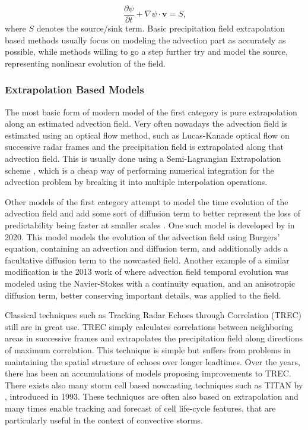 \begin{equation}
\
\frac{\partial \psi}{\partial t} + \nabla \psi \cdot \pmb{v} = S,
\end{equation}
%
where $S$ denotes the source/sink term. Basic precipitation field extrapolation based methods usually focus on modeling the advection part as accurately as possible, while methods willing to go a step further try and model the source, representing nonlinear evolution of the field. 

\subsubsection*{Extrapolation Based Models}

The most basic form of modern model of the first category is pure extrapolation along an estimated advection field. Very often nowadays the advection field is estimated using an optical flow method, such as Lucas-Kanade optical flow \cite{lucas1981iterative} on successive radar frames and the precipitation field is extrapolated along that advection field. This is usually done using a Semi-Lagrangian Extrapolation scheme \cite{staniforth_semi-lagrangian_1991}, which is a cheap way of performing numerical integration for the advection problem by breaking it into multiple interpolation operations. 

Other models of the first category attempt to model the time evolution of the advection field and add some sort of diffusion term to better represent the loss of predictability being faster at smaller scales \cite{germann2002scale}. One such model is developed by \citet{ryu_improved_2020} in 2020. This model models the evolution of the advection field using Burgers' equation, containing an advection and diffusion term, and additionally adds a facultative diffusion term to the nowcasted field. Another example of a similar modification is the 2013 work of \citet{sakaino_spatio-temporal_2013} where advection field temporal evolution was modeled using the Navier-Stokes with a continuity equation, and an anisotropic diffusion term, better conserving important details, was applied to the field. 

Classical techniques such as Tracking Radar Echoes through Correlation (TREC) \cite{rinehart_three-dimensional_1978} still are in great use. TREC simply calculates correlations between neighboring areas in successive frames and extrapolates the precipitation field along directions of maximum correlation. This technique is simple but suffers from problems in maintaining the spatial structure of echoes over longer leadtimes. Over the years, there has been an accumulations of models proposing improvements to TREC. There exists also many storm cell based nowcasting techniques such as TITAN by \citet{dixon1993titan}, introduced in 1993. These techniques are often also based on extrapolation and many times enable tracking and forecast of cell life-cycle features, that are particularly useful in the context of convective storms. 

